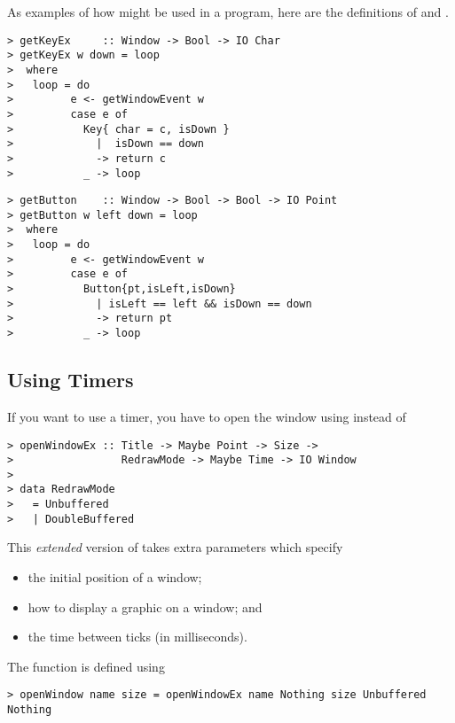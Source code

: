 As examples of how  might be used in a program, here are
the definitions of  and .

\begin{verbatim}
> getKeyEx     :: Window -> Bool -> IO Char
> getKeyEx w down = loop
>  where
>   loop = do
>         e <- getWindowEvent w
>         case e of 
>           Key{ char = c, isDown } 
>             |  isDown == down 
>             -> return c
>           _ -> loop
\end{verbatim}

\begin{verbatim}
> getButton    :: Window -> Bool -> Bool -> IO Point
> getButton w left down = loop
>  where
>   loop = do
>         e <- getWindowEvent w
>         case e of 
>           Button{pt,isLeft,isDown} 
>             | isLeft == left && isDown == down
>             -> return pt
>           _ -> loop
\end{verbatim}

\subsection{Using Timers}


If you want to use a timer, you have to open the window using
 instead of 

\begin{verbatim}
> openWindowEx :: Title -> Maybe Point -> Size ->
>                 RedrawMode -> Maybe Time -> IO Window
>
> data RedrawMode
>   = Unbuffered
>   | DoubleBuffered
\end{verbatim}

This {\em extended\/} version of  takes extra parameters
which specify
\begin{itemize}
\item the initial position of a window;
\item how to display a graphic on a window; and
\item the time between ticks (in milliseconds).
\end{itemize}

The function  is defined using 
\begin{verbatim}
> openWindow name size = openWindowEx name Nothing size Unbuffered Nothing
\end{verbatim}

